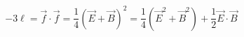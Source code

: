 \begin{equation}
-3 \ell =\vec{f} \cdot \vec{f}= \frac{1}{4} (\vec{E} +\vec{B})^{2} = \frac{1}{4} (
\vec{E}^{2} +\vec{B}^{2}) + \frac{1}{2} \vec{E} \cdot \vec{B}
\end{equation}

